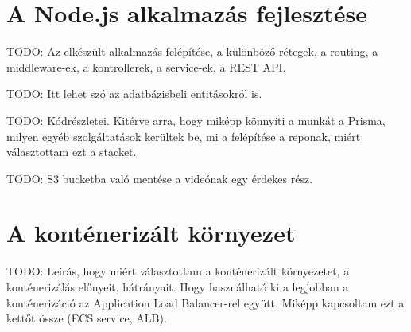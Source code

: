 \section{A Node.js alkalmazás fejlesztése}

TODO: Az elkészült alkalmazás felépítése, a különböző rétegek, a routing, a middleware-ek, a kontrollerek, a service-ek, a REST API.

TODO: Itt lehet szó az adatbázisbeli entitásokról is.

TODO: Kódrészletei. Kitérve arra, hogy miképp könnyíti a munkát a Prisma, milyen egyéb szolgáltatások kerültek be, mi a felépítése a reponak, miért választottam ezt a stacket.

TODO: S3 bucketba való mentése a videónak egy érdekes rész.

\section{A konténerizált környezet}

TODO: Leírás, hogy miért választottam a konténerizált környezetet, a konténerizálás előnyeit, hátrányait. Hogy használható ki a legjobban a konténerizáció az Application Load Balancer-rel együtt. Miképp kapcsoltam ezt a kettőt össze (ECS service, ALB).

